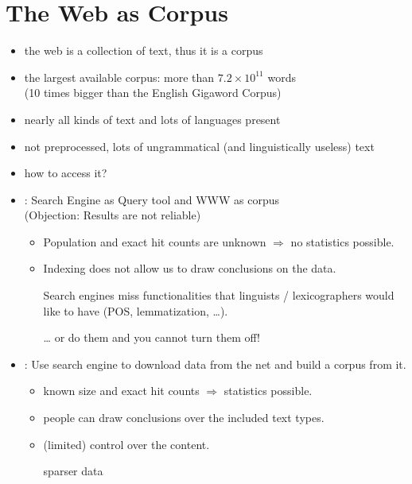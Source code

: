 \documentclass[a4paper,landscape,headrule,footrule,xetex]{foils}
\begin{document}
\section{The Web as Corpus}


\MyLogo{}
\begin{itemize}
\item the web is a collection of text, thus it is a corpus
\item the largest available corpus: more than $7.2 \times 10^{11}$ words 
\\ (10 times bigger than the English Gigaword Corpus) %
\item nearly all kinds of text and lots of languages present
\item not preprocessed, lots of ungrammatical (and linguistically useless) text
\item how to access it?
\end{itemize}

\begin{itemize}
\item {}: Search Engine as Query tool and WWW as corpus
\\  (Objection: Results are not reliable)
\begin{itemize}
\item Population and exact hit counts are unknown $\Rightarrow$ no statistics
possible.
\item Indexing does not allow us to draw conclusions on the data.
\item[\Bad] Search engines miss functionalities that linguists /
  lexicographers would like to have (POS, lemmatization, \ldots).
\item[\ldots] or do them and you cannot turn them off!
\end{itemize}
\item {}: Use search engine to download data from the
net and build a corpus from it.
\begin{itemize}
\item known size and exact hit counts $\Rightarrow$ statistics possible.
\item people can draw conclusions over the included text types.
\item (limited) control over the content.
\item[\Bad] sparser data
\end{itemize}
\end{itemize}
\end{document}
